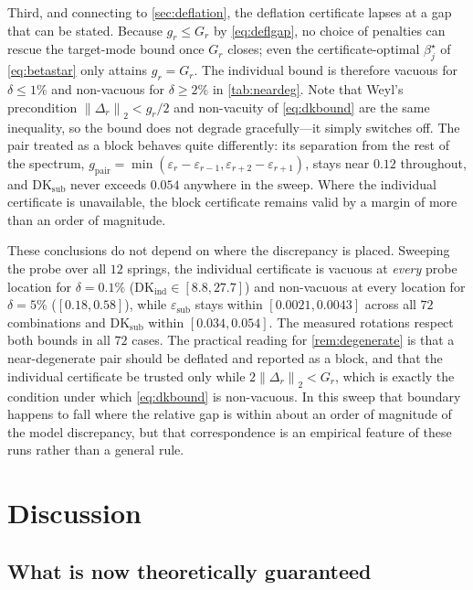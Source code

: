\documentclass{ieeeaccess}
\newcommand{\norm}[1]{\left\lVert #1\right\rVert}
\begin{document}
Third, and connecting to \cref{sec:deflation}, the deflation certificate lapses at a gap that
can be stated. Because $g_r\le G_r$ by \cref{eq:deflgap}, no choice of penalties can rescue the
target-mode bound once $G_r$ closes; even the certificate-optimal $\beta_j^\star$ of
\cref{eq:betastar} only attains $g_r=G_r$. The individual bound is therefore vacuous for
$\delta\le1\%$ and non-vacuous for $\delta\ge2\%$ in \cref{tab:neardeg}. Note that Weyl's
precondition $\norm{\Delta_r}_2<g_r/2$ and non-vacuity of \cref{eq:dkbound} are the same
inequality, so the bound does not degrade gracefully---it simply switches off. The pair treated
as a block behaves quite differently: its separation from the rest of the spectrum,
$g_{\mathrm{pair}}=\min(\varepsilon_r-\varepsilon_{r-1},\varepsilon_{r+2}-\varepsilon_{r+1})$,
stays near $0.12$ throughout, and $\mathrm{DK}_{\mathrm{sub}}$ never exceeds $0.054$ anywhere in
the sweep. Where the individual certificate is unavailable, the block certificate remains valid
by a margin of more than an order of magnitude.

These conclusions do not depend on where the discrepancy is placed. Sweeping the probe over all
$12$ springs, the individual certificate is vacuous at \emph{every} probe location for
$\delta=0.1\%$ ($\mathrm{DK}_{\mathrm{ind}}\in[8.8,27.7]$) and non-vacuous at every location for
$\delta=5\%$ ($[0.18,0.58]$), while $\varepsilon_{\mathrm{sub}}$ stays within
$[0.0021,0.0043]$ across all $72$ combinations and $\mathrm{DK}_{\mathrm{sub}}$ within
$[0.034,0.054]$. The measured rotations respect both bounds in all $72$ cases. The practical
reading for \cref{rem:degenerate} is that a near-degenerate pair should be deflated and reported
as a block, and that the individual certificate be trusted only while $2\norm{\Delta_r}_2<G_r$, which is
exactly the condition under which \cref{eq:dkbound} is non-vacuous. In this sweep that boundary
happens to fall where the relative gap is within about an order of magnitude of the model
discrepancy, but that correspondence is an empirical feature of these runs rather than a
general rule.

\section{Discussion}
\label{sec:discussion}

\subsection{What is now theoretically guaranteed}
\end{document}

